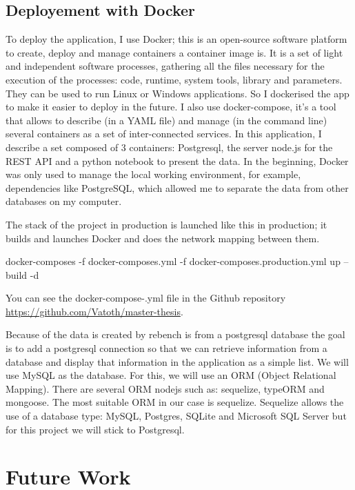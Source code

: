\documentclass{article}
\begin{document}
\subsection{}


\subsection{Deployement with Docker}

To deploy the application, I use Docker; this is an open-source software platform to create, deploy and manage containers a container image is. It is a set of light and independent software processes, gathering all the files necessary for the execution of the processes: code, runtime, system tools, library and parameters. They can be used to run Linux or Windows applications. So I dockerised the app to make it easier to deploy in the future. I also use docker-compose, it's a tool that allows to describe (in a YAML file) and manage (in the command line) several containers as a set of inter-connected services. In this application, I describe a set composed of 3 containers: Postgresql, the server node.js for the REST API and a python notebook to present the data. In the beginning, Docker was only used to manage the local working environment, for example, dependencies like PostgreSQL, which allowed me to separate the data from other databases on my computer.

The stack of the project in production is launched like this in production; it builds and launches Docker and does the network mapping between them.

docker-composes -f docker-composes.yml -f docker-composes.production.yml up --build -d

You can see the docker-compose-.yml file in the Github repository \url{https://github.com/Vatoth/master-thesis}. 

Because of the data is created by rebench is from a postgresql database the goal is to add a postgresql connection so that we can retrieve information from a database and display that information in the application as a simple list.
We will use MySQL as the database. For this, we will use an ORM (Object Relational Mapping). There are several ORM nodejs such as: sequelize, typeORM and mongoose. The most suitable ORM in our case is sequelize. Sequelize allows the use of a database type: MySQL, Postgres, SQLite and Microsoft SQL Server but for this project we will stick to Postgresql.

\section{Future Work}
\end{document}
